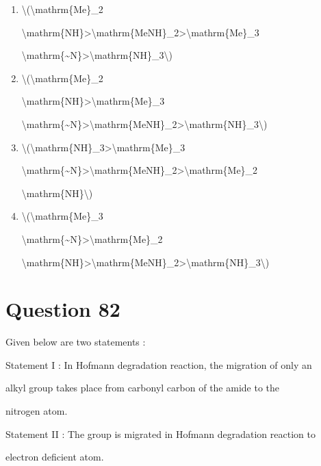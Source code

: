 \documentclass{article}
\begin{document}
\begin{enumerate}[label=(\alph*)]
\item \textbackslash(\textbackslash mathrm\{Me\}\_2

\textbackslash mathrm\{NH\}\textgreater\textbackslash mathrm\{MeNH\}\_2\textgreater\textbackslash mathrm\{Me\}\_3

\textbackslash mathrm\{\textasciitilde N\}\textgreater\textbackslash mathrm\{NH\}\_3\textbackslash)


\item \textbackslash(\textbackslash mathrm\{Me\}\_2

\textbackslash mathrm\{NH\}\textgreater\textbackslash mathrm\{Me\}\_3

\textbackslash mathrm\{\textasciitilde N\}\textgreater\textbackslash mathrm\{MeNH\}\_2\textgreater\textbackslash mathrm\{NH\}\_3\textbackslash)


\item \textbackslash(\textbackslash mathrm\{NH\}\_3\textgreater\textbackslash mathrm\{Me\}\_3

\textbackslash mathrm\{\textasciitilde N\}\textgreater\textbackslash mathrm\{MeNH\}\_2\textgreater\textbackslash mathrm\{Me\}\_2

\textbackslash mathrm\{NH\}\textbackslash)


\item \textbackslash(\textbackslash mathrm\{Me\}\_3

\textbackslash mathrm\{\textasciitilde N\}\textgreater\textbackslash mathrm\{Me\}\_2

\textbackslash mathrm\{NH\}\textgreater\textbackslash mathrm\{MeNH\}\_2\textgreater\textbackslash mathrm\{NH\}\_3\textbackslash)


\end{enumerate}
\newpage
\section*{Question 82}
Given below are two statements :



Statement I : In Hofmann degradation reaction, the migration of only an

alkyl group takes place from carbonyl carbon of the amide to the

nitrogen atom.



Statement II : The group is migrated in Hofmann degradation reaction to

electron deficient atom.
\end{document}
